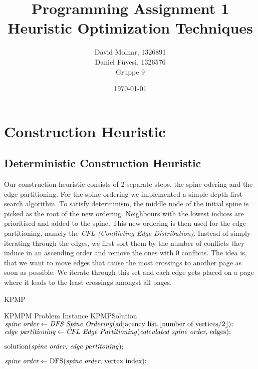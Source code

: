 \documentclass[11pt]{article}
\title{Programming Assignment 1\\ \vspace{10px} \large Heuristic Optimization Techniques}
\author{David Molnar, 1326891\\ Daniel Füvesi, 1326576\\Gruppe 9}
\date{\today}
\DeclarePairedDelimiter\floor{\lfloor}{\rfloor}
\begin{document}
\lstset{language=Java}
\maketitle
 
\section{Construction Heuristic}
\subsection{Deterministic Construction Heuristic}

\hspace{0.5cm} Our construction heuristic consists of 2 separate steps, the spine odering and the edge partitioning. For the spine ordering we implemented a simple depth-first search algorithm. To satisfy determinism, the middle node of the initial spine is picked as the root of the new ordering. Neighbours with the lowest indices are prioritised and added to the spine. This new ordering is then used for the edge partitioning, namely the \textit{CFL (Conflicting Edge Distribution)}. Instead of simply iterating through the edges, we first sort them by the number of conflicts they induce in an ascending order and remove the ones with 0 conflicts. The idea is, that we want to move edges that cause the most crossings to another page as soon as possible. We iterate through this set and each edge gets placed on a page where it leads to the least crossings amongst all pages.\\
\begin{algorithm}
	\caption{KPMP}\label{euclid}
	\begin{algorithmic}[1]
		\Require KPMPM Problem Instance
		\Ensure KPMPSolution
		\State $\textit{spine order} \gets \text{\textit{DFS Spine Ordering}(adjacency list,$\floor*{\text{number of vertices} / 2}$)};$
		\State $\textit{edge partitioning} \gets \text{\textit{CFL Edge Partitioning}($\textit{calculated spine order}$, edges)};$
		
		\Return $\text{solution(\textit{spine order, edge partitoning})};$
		\EndFunction
		\newline
		
		\Return $\textit{spine order} \gets \text{DFS(\textit{spine order}, vertex index)};$
		\EndFunction
	
	\end{algorithmic}
\end{algorithm}
\end{document}
